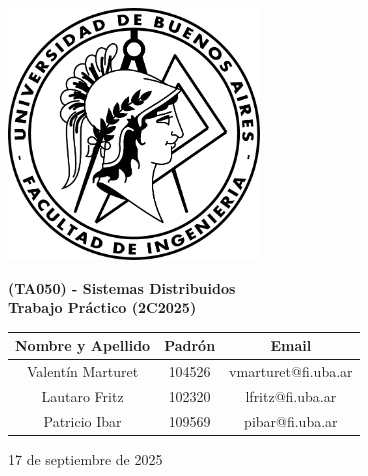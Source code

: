 \documentclass{article}
\begin{document}
    
    
    \begin{center}
        \includegraphics[width=0.5\textwidth]
        {imagenes/Logo-fiuba.png}

        \vspace{1cm}
        {\LARGE \textbf{(TA050) - Sistemas Distribuidos}} \\
        \vspace{1cm}
        {\LARGE \textbf{Trabajo Práctico (2C2025)}} \\
        \vspace{1cm}
        \begin{table}[h]
            \centering
            \begin{tabular}{c c c}
                \hline
                \textbf{Nombre y Apellido} & \textbf{Padrón} & \textbf{Email} \\ \hline
                Valentín Marturet & 104526 & vmarturet@fi.uba.ar \\
                Lautaro Fritz & 102320 & lfritz@fi.uba.ar \\
                Patricio Ibar & 109569 & pibar@fi.uba.ar \\
                \hline
            \end{tabular}
        \end{table}

        \vspace{1cm}

        17 de septiembre de 2025

    \end{center}

    \newpage

    \tableofcontents
    \newpage

    
    
    

    \newpage

    
\end{document}
